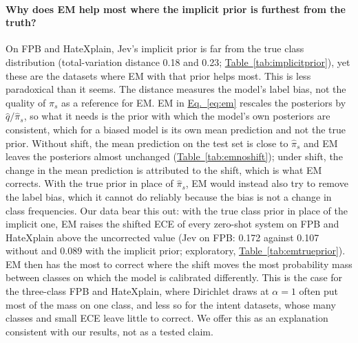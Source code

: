 \paragraph{Why does EM help most where the implicit prior is furthest from the truth?}
On FPB and HateXplain, Jev's implicit prior is far from the true class distribution (total-variation distance 0.18 and
0.23; \hyperref[tab:implicitprior]{Table~\ref*{tab:implicitprior}}), yet these are the datasets where EM with that prior helps most. This is less
paradoxical than it seems. The distance measures the model's label bias, not the quality of $\hat\pi_s$ as a reference
for EM. EM in \hyperref[eq:em]{Eq.~\ref*{eq:em}} rescales the posteriors by $\hat q/\hat\pi_s$, so what it needs is the prior with which
the model's own posteriors are consistent, which for a biased model is its own mean prediction and not the true prior.
Without shift, the mean prediction on the test set is close to $\hat\pi_s$ and EM leaves the posteriors almost
unchanged (\hyperref[tab:emnoshift]{Table~\ref*{tab:emnoshift}}); under shift, the change in the mean prediction is attributed to the shift, which
is what EM corrects. With the true prior in place of $\hat\pi_s$, EM would instead also try to remove the label bias,
which it cannot do reliably because the bias is not a change in class frequencies. Our data bear this out: with the
true class prior in place of the implicit one, EM raises the shifted ECE of every zero-shot system on FPB and
HateXplain above the uncorrected value (Jev on FPB: 0.172 against 0.107 without and 0.089 with the implicit prior;
exploratory, \hyperref[tab:emtrueprior]{Table~\ref*{tab:emtrueprior}}). EM then has the most to correct
where the shift moves the most probability mass between classes on which the model is calibrated differently. This is
the case for the three-class FPB and HateXplain, where Dirichlet draws at $\alpha=1$ often put most of the mass on one
class, and less so for the intent datasets, whose many classes and small ECE leave little to correct. We offer this as
an explanation consistent with our results, not as a tested claim.

